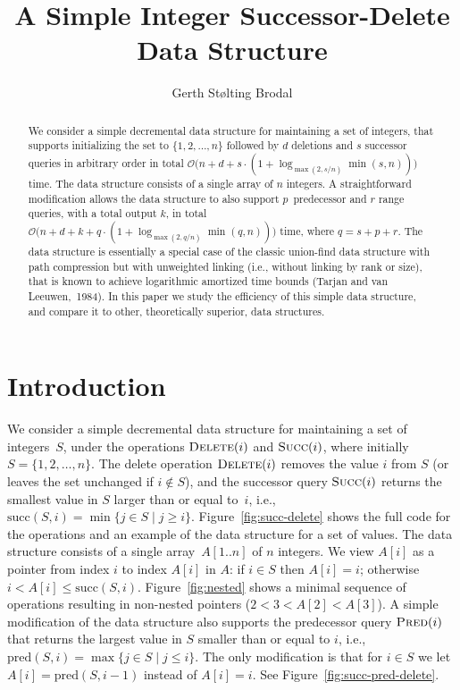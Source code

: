 \documentclass[a4paper]{lipics-v2021}
\title{A Simple Integer Successor-Delete Data Structure}
\author{Gerth Stølting Brodal}{Aarhus University, Department of Computer Science, Denmark \and \url{http://www.cs.au.dk/~gerth}}{gerth@cs.au.dk}{https://orcid.org/0000-0001-9054-915X}{} %
\newcommand{\Oh}{\mathcal{O}}
\newcommand{\successor}{\mathrm{succ}}
\newcommand{\predecessor}{\mathrm{pred}}
\newcommand{\FuncName}[1]{\textup{\textsc{#1}}}
\newcommand{\Delete}{\FuncName{Delete}}
\newcommand{\Succ}{\FuncName{Succ}}
\newcommand{\Pred}{\FuncName{Pred}}
\begin{document}
\maketitle

\begin{abstract}
  We consider a simple decremental data structure for maintaining a set of integers, that supports initializing the set to $\{1,2,\ldots,n\}$ followed by $d$ deletions and $s$ successor queries in arbitrary order in total $\Oh\big(n+d+s\cdot (1+\log_{\max(2,s/n)} \min(s,n))\big)$ time. The data structure consists of a single array of $n$ integers. A straightforward modification allows the data structure to also support $p$~predecessor and $r$ range queries, with a total output $k$, in total $\Oh\big(n+d+k+q \cdot (1+\log_{\max(2,q/n)} \min(q,n))\big)$ time, where $q=s+p+r$. The data structure is essentially a special case of the classic union-find data structure with path compression but with unweighted linking (i.e., without linking by rank or size), that is known to achieve logarithmic amortized time bounds (Tarjan and van Leeuwen,~1984). In this paper we study the efficiency of this simple data structure, and compare it to other, theoretically superior, data structures.
\end{abstract}

\section{Introduction}

We consider a simple decremental data structure for maintaining a set of integers~$S$, under the operations $\Delete(i)$ and $\Succ(i)$, where initially $S=\{1,2,\ldots,n\}$. The delete operation $\Delete(i)$ removes the value $i$ from $S$ (or leaves the set unchanged if $i \notin S$), and the successor query $\Succ(i)$ returns the smallest value in $S$ larger than or equal to~$i$, i.e., $\successor(S, i)=\min \{ j \in S \mid j \geq i \}$. Figure~\ref{fig:succ-delete} shows the full code for the operations and an example of the data structure for a set of values. The data structure consists of a single array~$A[1..n]$ of $n$ integers. We view $A[i]$ as a pointer from index $i$ to index $A[i]$ in $A$: if $i\in S$ then $A[i] = i$; otherwise $i<A[i]\leq \successor(S, i)$. Figure~\ref{fig:nested} shows a minimal sequence of operations resulting in non-nested pointers ($2<3<A[2]<A[3]$). A simple modification of the data structure also supports the predecessor query $\Pred(i)$ that returns the largest value in $S$ smaller than or equal to $i$, i.e., $\predecessor(S, i)=\max \{ j \in S \mid j \leq i \}$. The only modification is that for $i\in S$ we let $A[i] = \predecessor(S, i-1)$ instead of $A[i]=i$. See Figure~\ref{fig:succ-pred-delete}.
\end{document}
